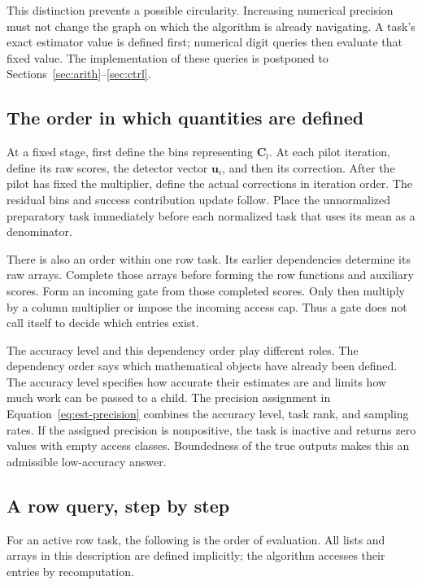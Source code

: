 \documentclass[11pt]{article}
\numberwithin{equation}{section}
\theoremstyle{definition}
\theoremstyle{remark}
\begin{document}
This distinction prevents a possible circularity. Increasing numerical precision must not change the graph on which the algorithm is already navigating. A task's exact estimator value is defined first; numerical digit queries then evaluate that fixed value. The implementation of these queries is postponed to Sections~\ref{sec:arith}--\ref{sec:ctrl}.

\subsection{The order in which quantities are defined}

At a fixed stage, first define the bins representing ${\mathbf{C}}_l$. At each pilot iteration, define its raw scores, the detector vector ${\mathbf{u}}_i$, and then its correction. After the pilot has fixed the multiplier, define the actual corrections in iteration order. The residual bins and success contribution update follow. Place the unnormalized preparatory task immediately before each normalized task that uses its mean as a denominator.

There is also an order within one row task. Its earlier dependencies determine its raw arrays. Complete those arrays before forming the row functions and auxiliary scores. Form an incoming gate from those completed scores. Only then multiply by a column multiplier or impose the incoming access cap. Thus a gate does not call itself to decide which entries exist.

The accuracy level and this dependency order play different roles. The dependency order says which mathematical objects have already been defined. The accuracy level specifies how accurate their estimates are and limits how much work can be passed to a child. The precision assignment in Equation~\eqref{eq:est-precision} combines the accuracy level, task rank, and sampling rates. If the assigned precision is nonpositive, the task is inactive and returns zero values with empty access classes. Boundedness of the true outputs makes this an admissible low-accuracy answer.

\subsection{A row query, step by step}

For an active row task, the following is the order of evaluation. All lists and arrays in this description are defined implicitly; the algorithm accesses their entries by recomputation.
\end{document}

